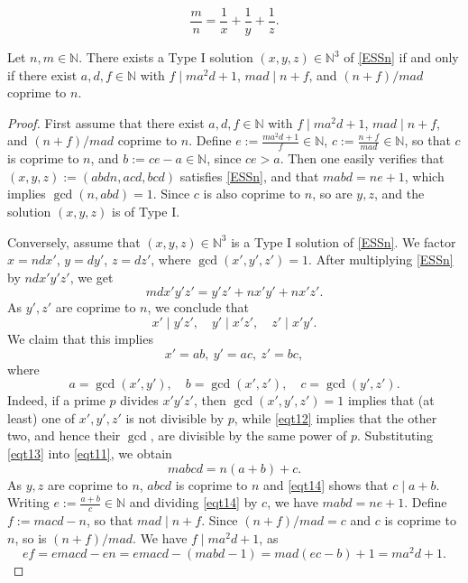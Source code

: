 \documentclass[10pt,a4paper]{amsart}
\begin{document}
\begin{equation}
\label{ESSn}
\frac m n=\frac1x+\frac1y+\frac1z.
\end{equation}

\begin{prop}\label{proptype1par}
Let $n,m \in \mathbb{N}$. There exists a Type I solution $(x,y,z)\in \mathbb{N}^3$ of \eqref{ESSn} if and only if 
there exist $a, d, f \in \mathbb{N}$ with $f\mid ma^2d+1$, $mad\mid n+f$, and $(n+f)/mad$ coprime to $n$. 
\end{prop}

\begin{proof}
First assume that there exist $a, d, f \in \mathbb{N}$ with $f\mid ma^2d+1$, $mad\mid n+f$, and $(n+f)/mad$ coprime to $n$. 
Define $e:=\frac{ma^2d+1}{f}\in \mathbb{N}$, $c:=\frac{n+f}{mad}\in \mathbb{N}$, so that $c$ is coprime to $n$,
and $b:=ce-a\in \mathbb{N}$, since $ce>a$. Then one easily verifies that $(x,y,z):=(abdn,acd, bcd)$ satisfies \eqref{ESSn},
and that $mabd=ne+1$, which implies $\gcd(n,abd)=1$. Since $c$ is also coprime to $n$,
so are $y,z$, and the solution $(x,y,z)$ is of Type I.

Conversely, assume that  $(x,y,z)\in \mathbb{N}^3$ is a Type I solution of \eqref{ESSn}.
We factor $x = ndx'$, $y = dy'$, $z = dz'$, where $\gcd(x',y',z')=1$. After multiplying \eqref{ESSn}
by $ndx'y'z'$, we get
\begin{equation}\label{eqt11}
mdx'y'z' = y'z' + nx'y' + nx'z'.
\end{equation}
As $y',z'$ are coprime to $n$, we conclude that 
\begin{equation}\label{eqt12}
x'\mid y'z', \quad y'\mid x'z', \quad z'\mid x'y'.
\end{equation}
We claim that this  implies
\begin{equation}\label{eqt13}
x'=ab, \ y'=ac, \ z'=bc,
\end{equation}
where
$$
a=\gcd(x',y'),\quad b=\gcd(x',z'), \quad c=\gcd(y',z').
$$
Indeed, if a prime $p$ divides $x'y'z'$, then $\gcd(x',y',z')=1$ implies that (at least) one of $x',y',z'$ is 
not divisible by $p$, while \eqref{eqt12} implies that the other two, and hence their $\gcd$, are divisible 
by the same power of $p$. 
Substituting \eqref{eqt13} into \eqref{eqt11}, we obtain
\begin{equation}\label{eqt14}
mabcd = n(a+b)+c.
\end{equation}
As $y,z$ are coprime to $n$, $abcd$ is coprime to $n$ and
\eqref{eqt14} shows that $c\mid a+b$. Writing $e:=\frac{a+b}{c}\in \mathbb{N}$ and dividing \eqref{eqt14} by $c$, we have 
$mabd = ne+1$. Define $f:=macd-n$, so that $mad\mid n+f$. Since $(n+f)/mad=c$ and $c$ is coprime to $n$, so is $(n+f)/mad$.
We have $f\mid ma^2d+1$, as
$$
ef = emacd-en=emacd-(mabd-1)=mad(ec-b)+1=ma^2d+1.
$$
\end{proof}
\end{document}
